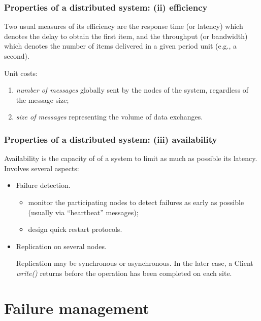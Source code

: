 \documentclass{beamer}
\begin{document}
\begin{frame}
\frametitle{Properties of a distributed system: (ii) efficiency}

Two usual measures of its efficiency are the \alert{response time} (or latency)
 which denotes the delay to obtain the first item, and the \alert{throughput}
 (or bandwidth)
 which denotes the number of items delivered in a given period unit (e.g., a
 second).

\vfill

Unit costs:

 \begin{enumerate}
   \item  \emph{number of messages} 
   globally sent by the nodes of the system, regardless of the message size;
   \item  \emph{size of messages} representing  the volume of data
   exchanges.
 \end{enumerate}
 
\end{frame}

\begin{frame}
\frametitle{Properties of a distributed system: (iii) availability}

\alert{Availability} is the capacity of of a system to limit as much as possible 
its latency.
Involves several aspects:
\begin{itemize}
  \item \alert{Failure detection.}
  \begin{itemize}
    \item  monitor the participating nodes to detect
  failures as early as possible (usually via ``heartbeat'' messages); 
  \item design quick restart protocols.
\end{itemize}

  \item \alert{Replication} on several nodes.
  
  Replication may be \alert{synchronous} or \alert{asynchronous}. 
  In the later case, a Client \textit{write()} returns before the operation
  has been completed on each site.

\end{itemize} 

\end{frame}

\section{Failure management}
\end{document}

